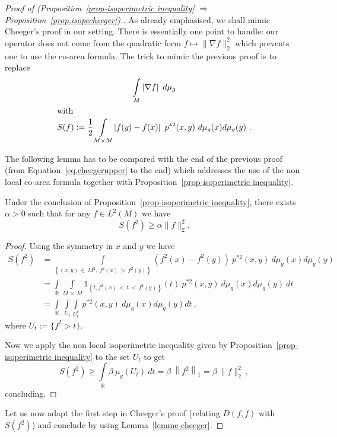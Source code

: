 \documentclass[AHL,Unicode,longabstracts,published]{cedram}
\newcommand{\dsun}{\mathds{1}}
\newcommand{\RR}{\mathbb{R}}
\newcommand{\inte}[1]{\underset{#1}{\int}}
\begin{document}
\begin{proof}[{Proof of (Proposition~\ref{prop-isoperimetric inequality} $\Rightarrow$ Proposition~\ref{prop.isopecheeger}).}]
As already emphasised, we shall mimic Cheeger's proof in our setting. There is essentially one point to handle: our operator does not come from the quadratic form $f \mapsto \|\nabla f\|_2^2$ which prevents one to use the co-area formula. The trick to mimic the previous proof is to replace
\begin{gather*}
\inte{M} \left|\nabla f\right| \ d \mu_g
\\
\intertext{with}
S(f) := \frac{1}{2} \inte{M \times M} \left|f(y)-f(x)\right| \ p^{*2}(x,y) \ d \mu_g(x) d \mu_g(y) \ .
\end{gather*}

The following lemma has to be compared with the end of the previous proof (from Equation~\eqref{eq.cheegerupper} to the end) which addresses the use of the non local co-area formula together with Proposition~\ref{prop-isoperimetric inequality}.

\begin{lemm}\label{lemme-cheeger}
Under the conclusion of Proposition~\ref{prop-isoperimetric inequality}, there exists $\alpha>0$ such that for any $f \in L^2(M)$ we have
\[
S(f^2) \geq \alpha \| f\|^2_2.
\]
\end{lemm}

\begin{proof}
Using the symmetry in $x$ and $y$ we have
\begin{align*}
S(f^2) &= \inte{ \left\{ (x,y)\, \in\,M^2,\ f^2(x)\,>\,f^2(y)\right\} } \left(f^2(x) -f^2(y)\right) \ p^{*2}(x,y) \ d \mu_g(x) d \mu_g(y) \\
&= \inte{\RR} \inte{M\,\times\,M} \dsun_{\left\{t, f^2(x)\,<\,t\,<\,f^2(y)\right\} } (t) \ p^{*2}(x,y) \ d \mu_g(x) d \mu_g(y) \ dt \\
& = \inte{\RR} \ \inte{U_t} \inte{U_t^c} \ p^{*2}(x,y) \ d \mu_g(x) d \mu_g(y) dt \ ,
\end{align*}
where $U_t := \{ f^2 > t\} $.

Now we apply the non local isoperimetric inequality given by Proposition~\ref{prop-isoperimetric inequality} to the set $U_t$ to get
\[
S(f^2) \geq \inte{\RR} \beta \ \mu_g(U_t) \ dt = \beta \ \left\|f^2\right\|_1 = \beta \ \|f\|^2_2 \ ,
\]
concluding.
\end{proof}

Let us now adapt the first step in Cheeger's proof (relating $D(f,f)$ with $S(f^2) $) and conclude by using Lemma~\ref{lemme-cheeger}.


\end{proof}
\end{document}
